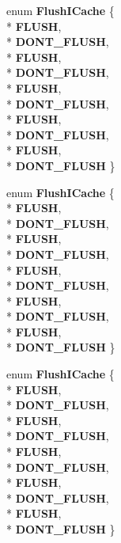 \begin{DoxyCompactItemize}
\item 
enum {\bfseries Flush\+I\+Cache} \{ \\*
{\bfseries F\+L\+U\+SH}, 
\\*
{\bfseries D\+O\+N\+T\+\_\+\+F\+L\+U\+SH}, 
\\*
{\bfseries F\+L\+U\+SH}, 
\\*
{\bfseries D\+O\+N\+T\+\_\+\+F\+L\+U\+SH}, 
\\*
{\bfseries F\+L\+U\+SH}, 
\\*
{\bfseries D\+O\+N\+T\+\_\+\+F\+L\+U\+SH}, 
\\*
{\bfseries F\+L\+U\+SH}, 
\\*
{\bfseries D\+O\+N\+T\+\_\+\+F\+L\+U\+SH}, 
\\*
{\bfseries F\+L\+U\+SH}, 
\\*
{\bfseries D\+O\+N\+T\+\_\+\+F\+L\+U\+SH}
 \}\hypertarget{classv8_1_1internal_1_1_code_patcher_abae8f363a339ca649dca5491f4f29a8d}{}\label{classv8_1_1internal_1_1_code_patcher_abae8f363a339ca649dca5491f4f29a8d}

\item 
enum {\bfseries Flush\+I\+Cache} \{ \\*
{\bfseries F\+L\+U\+SH}, 
\\*
{\bfseries D\+O\+N\+T\+\_\+\+F\+L\+U\+SH}, 
\\*
{\bfseries F\+L\+U\+SH}, 
\\*
{\bfseries D\+O\+N\+T\+\_\+\+F\+L\+U\+SH}, 
\\*
{\bfseries F\+L\+U\+SH}, 
\\*
{\bfseries D\+O\+N\+T\+\_\+\+F\+L\+U\+SH}, 
\\*
{\bfseries F\+L\+U\+SH}, 
\\*
{\bfseries D\+O\+N\+T\+\_\+\+F\+L\+U\+SH}, 
\\*
{\bfseries F\+L\+U\+SH}, 
\\*
{\bfseries D\+O\+N\+T\+\_\+\+F\+L\+U\+SH}
 \}\hypertarget{classv8_1_1internal_1_1_code_patcher_abae8f363a339ca649dca5491f4f29a8d}{}\label{classv8_1_1internal_1_1_code_patcher_abae8f363a339ca649dca5491f4f29a8d}

\item 
enum {\bfseries Flush\+I\+Cache} \{ \\*
{\bfseries F\+L\+U\+SH}, 
\\*
{\bfseries D\+O\+N\+T\+\_\+\+F\+L\+U\+SH}, 
\\*
{\bfseries F\+L\+U\+SH}, 
\\*
{\bfseries D\+O\+N\+T\+\_\+\+F\+L\+U\+SH}, 
\\*
{\bfseries F\+L\+U\+SH}, 
\\*
{\bfseries D\+O\+N\+T\+\_\+\+F\+L\+U\+SH}, 
\\*
{\bfseries F\+L\+U\+SH}, 
\\*
{\bfseries D\+O\+N\+T\+\_\+\+F\+L\+U\+SH}, 
\\*
{\bfseries F\+L\+U\+SH}, 
\\*
{\bfseries D\+O\+N\+T\+\_\+\+F\+L\+U\+SH}
 \}\hypertarget{classv8_1_1internal_1_1_code_patcher_abae8f363a339ca649dca5491f4f29a8d}{}\label{classv8_1_1internal_1_1_code_patcher_abae8f363a339ca649dca5491f4f29a8d}

\end{DoxyCompactItemize}
